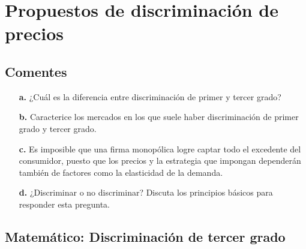 \documentclass{exam}
\begin{document}
\section*{Propuestos de discriminación de precios}

\subsection*{Comentes}

\begin{itemize}
    \item[\textbf{a.}] ¿Cuál es la diferencia entre discriminación de primer y tercer grado?
    \item[\textbf{b.}] Caracterice los mercados en los que suele haber discriminación de primer grado y tercer grado. 
    \item[\textbf{c.}] Es imposible que una firma monopólica logre captar todo el excedente del consumidor, puesto que los precios y la estrategia que impongan dependerán también de factores como la elasticidad de la demanda.
    \item[\textbf{d.}] ¿Discriminar o no discriminar? Discuta los principios básicos para responder esta pregunta.
    \end{itemize}

\subsection*{Matemático: Discriminación de tercer grado}
\end{document}
